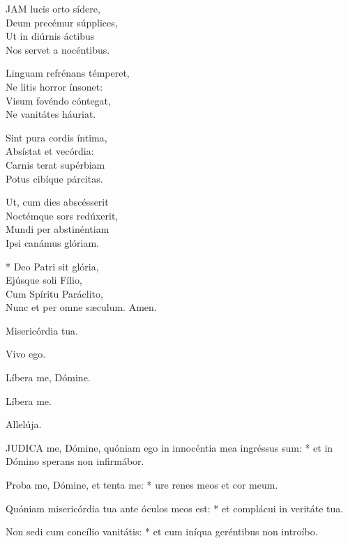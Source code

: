 
\lettrine[lines=2]{J}{AM} lucis orto sídere,\\
Deum precémur súpplices,\\
Ut in diúrnis áctibus\\
Nos servet a nocéntibus.

Linguam refrénans témperet,\\
Ne litis horror ínsonet:\\
Visum fovéndo cóntegat,\\
Ne vanitátes háuriat.

Sint pura cordis íntima,\\
Absístat et vecórdia:\\
Carnis terat supérbiam\\
Potus cibíque párcitas.

Ut, cum dies abscésserit\\
Noctémque sors redúxerit,\\
Mundi per abstinéntiam\\
Ipsi canámus glóriam.

* Deo Patri sit glória,\\
Ejúsque soli Fílio,\\
Cum Spíritu Paráclito,\\
Nunc et per omne sæculum. Amen.

  Misericórdia tua.



 Vivo ego.


 Líbera me, Dómine.


 Líbera me.

  Allelúja.


\lettrine[lines=2]{J}{UDICA} me, Dómine, quóniam ego in innocéntia mea ingréssus sum: * et in Dómino sperans non infirmábor.

Proba me, Dómine, et tenta me: * ure renes meos et cor meum.

Quóniam misericórdia tua ante óculos meos est: * et complácui in veritáte tua.

Non sedi cum concílio vanitátis: * et cum iníqua geréntibus non introíbo.

